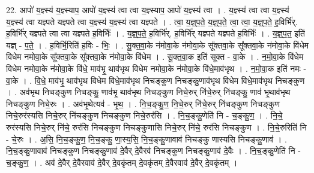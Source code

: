 \documentclass[17pt]{extarticle}
\begin{document}
22. आपो॑ य॒ज्ञ्स्य॑ य॒ज्ञ्स्याप॒ आपो॑ य॒ज्ञ्स्य॑ त्वा त्वा य॒ज्ञ्स्याप॒ आपो॑ य॒ज्ञ्स्य॑ त्वा । . य॒ज्ञ्स्य॑ त्वा त्वा य॒ज्ञ्स्य॑ य॒ज्ञ्स्य॑ त्वा यज्ञ्पते यज्ञ्पते त्वा य॒ज्ञ्स्य॑ य॒ज्ञ्स्य॑ त्वा यज्ञ्पते । . त्वा॒ य॒ज्ञ्॒प॒ते॒ य॒ज्ञ्॒प॒ते॒ त्वा॒ त्वा॒ य॒ज्ञ्॒प॒ते॒ ह॒विर्भि॑र्. ह॒विर्भि॑र् यज्ञ्पते त्वा त्वा यज्ञ्पते ह॒विर्भिः॑ । . य॒ज्ञ्॒प॒ते॒ ह॒विर्भि॑र्. ह॒विर्भि॑र् यज्ञ्पते यज्ञ्पते ह॒विर्भिः॑ । . य॒ज्ञ्॒प॒त॒ इति॑ यज्ञ् - प॒ते॒ । . ह॒विर्भि॒रिति॑ ह॒विः - भिः॒ । . सू॒क्त॒वा॒के न॑मोवा॒के न॑मोवा॒के सू᳚क्तवा॒के सू᳚क्तवा॒के न॑मोवा॒के वि॑धेम विधेम नमोवा॒के सू᳚क्तवा॒के सू᳚क्तवा॒के न॑मोवा॒के वि॑धेम । . सू॒क्त॒वा॒क इति॑ सूक्त - वा॒के । . न॒मो॒वा॒के वि॑धेम विधेम नमोवा॒के न॑मोवा॒के वि॑धे॒ माव॑भृ॒ थाव॑भृथ विधेम नमोवा॒के न॑मोवा॒के वि॑धे॒माव॑भृथ । . न॒मो॒वा॒क इति॑ नमः - वा॒के । . वि॒धे॒ माव॑भृ॒ थाव॑भृथ विधेम विधे॒माव॑भृथ निचङ्कुण निचङ्कु॒णाव॑भृथ विधेम विधे॒माव॑भृथ निचङ्कुण । . अव॑भृथ निचङ्कुण निचङ्कु॒ णाव॑भृ॒ थाव॑भृथ निचङ्कुण निचे॒रुर् नि॑चे॒रुर् नि॑चङ्कु॒ णाव॑ भृ॒थाव॑भृथ निचङ्कुण निचे॒रुः । . अव॑भृ॒थेत्यव॑ - भृ॒थ॒ । . नि॒च॒ङ्कु॒ण॒ नि॒चे॒रुर् नि॑चे॒रुर् नि॑चङ्कुण निचङ्कुण निचे॒रुर॑स्यसि निचे॒रुर् नि॑चङ्कुण निचङ्कुण निचे॒रुर॑सि । . नि॒च॒ङ्कु॒णेति॑ नि - च॒ङ्कु॒ण॒ । . नि॒चे॒ रुर॑स्यसि निचे॒रुर् नि॑चे॒ रुर॑सि निचङ्कुण निचङ्कुणासि निचे॒रुर् नि॑चे॒ रुर॑सि निचङ्कुण । . नि॒चे॒रुरिति॑ नि - चे॒रुः । . अ॒सि॒ नि॒च॒ङ्कु॒ण॒ नि॒च॒ङ्कु॒ णा॒स्य॒सि॒ नि॒च॒ङ्कु॒णावाव॑ निचङ्कु णास्यसि निचङ्कु॒णाव॑ । . नि॒च॒ङ्कु॒णावाव॑ निचङ्कुण निचङ्कु॒णाव॑ दे॒वैर् दे॒वैरव॑ निचङ्कुण निचङ्कु॒णाव॑ दे॒वैः । . नि॒च॒ङ्कु॒णेति॑ नि - च॒ङ्कु॒ण॒ । . अव॑ दे॒वैर् दे॒वैरवाव॑ दे॒वैर् दे॒वकृ॑तम् दे॒वकृ॑तम् दे॒वैरवाव॑ दे॒वैर् दे॒वकृ॑तम् । \newline
\end{document}
